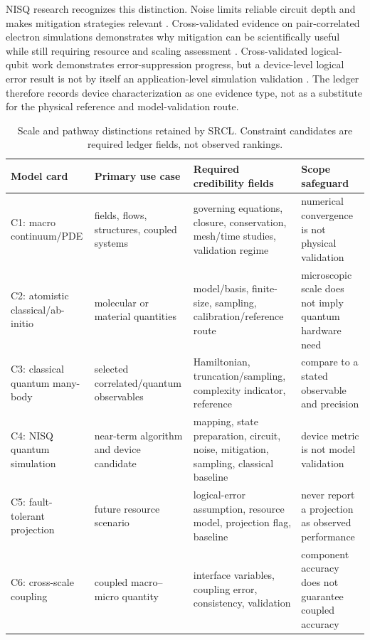 \documentclass[conference]{../../../../Conference-LaTeX-template_10-17-19/IEEEtran}
\begin{document}
NISQ research recognizes this distinction. Noise limits reliable circuit depth and makes mitigation strategies relevant \cite{preskill2018}. Cross-validated evidence on pair-correlated electron simulations demonstrates why mitigation can be scientifically useful while still requiring resource and scaling assessment \cite{obrien2023}. Cross-validated logical-qubit work demonstrates error-suppression progress, but a device-level logical error result is not by itself an application-level simulation validation \cite{google2023}. The ledger therefore records device characterization as one evidence type, not as a substitute for the physical reference and model-validation route.

\begin{table}[!t]
\caption{Scale and pathway distinctions retained by SRCL. Constraint candidates are required ledger fields, not observed rankings.}
\label{tab:pathways}
\centering
\small
\begin{tabularx}{\textwidth}{lYYY}
\toprule
Model card & Primary use case & Required credibility fields & Scope safeguard \\
\midrule
C1: macro continuum/PDE & fields, flows, structures, coupled systems & governing equations, closure, conservation, mesh/time studies, validation regime & numerical convergence is not physical validation \\
C2: atomistic classical/ab-initio & molecular or material quantities & model/basis, finite-size, sampling, calibration/reference route & microscopic scale does not imply quantum hardware need \\
C3: classical quantum many-body & selected correlated/quantum observables & Hamiltonian, truncation/sampling, complexity indicator, reference & compare to a stated observable and precision \\
C4: NISQ quantum simulation & near-term algorithm and device candidate & mapping, state preparation, circuit, noise, mitigation, sampling, classical baseline & device metric is not model validation \\
C5: fault-tolerant projection & future resource scenario & logical-error assumption, resource model, projection flag, baseline & never report a projection as observed performance \\
C6: cross-scale coupling & coupled macro--micro quantity & interface variables, coupling error, consistency, validation & component accuracy does not guarantee coupled accuracy \\
\bottomrule
\end{tabularx}
\end{table}
\end{document}
